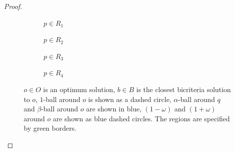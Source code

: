 \documentclass[11pt]{article}
\begin{document}
\begin{proof}
\begin{itemize}
 
\begin{figure}[ht]

  \begin{subfigure}[b]{0.5\linewidth}
    \centering
    \tikzI
    \caption{\footnotesize  $p \in R_1$ } 
    \label{fig:a} 
    \vspace{4ex}
 \end{subfigure}%
 \begin{subfigure}[b]{0.5\linewidth}
    \centering
    \tikzII    
    \caption{$p\in R_2$} 
    \label{fig:b} 
    \vspace{4ex}
 \end{subfigure} 
 \begin{subfigure}[b]{0.5\linewidth}
    \centering
    \tikzIII
    \caption{$p \in R_3$} 
    \label{fig:c} 
    \vspace{4ex}
 \end{subfigure}%
 \begin{subfigure}[b]{0.5\linewidth}
 \centering
  \tikzIV
  \caption{$p\in R_4$}
  \label{fig:d} 
  \end{subfigure} 
  \caption{\footnotesize $o\in O$ is an optimum solution, $b\in B$ is the closest bicriteria solution to $o$, $1$-ball around $o$ is shown as a dashed circle, $\alpha$-ball around $q$ and $\beta$-ball around $o$ are shown in blue, $(1-\omega)$ and $(1+\omega)$ around $o$ are shown as blue dashed circles. The regions are specified by green borders. }
  \label{fig} 
\end{figure}



\end{itemize}
\end{proof}
\end{document}
